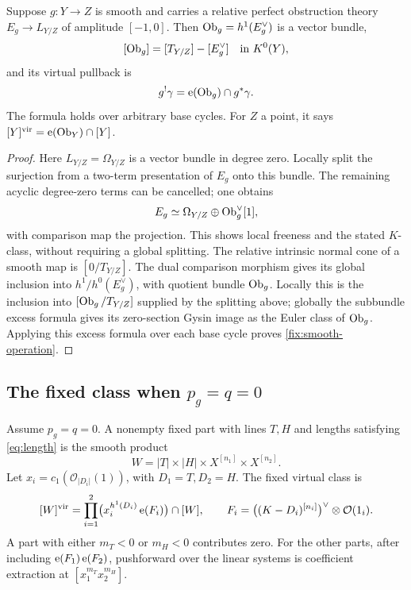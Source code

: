 \begin{lemma}\label{fix:smooth-euler}
Suppose \(g:Y\to Z\) is smooth and carries a relative perfect
obstruction theory \(E_g\to L_{Y/Z}\) of amplitude \([-1,0]\).
Then \(\operatorname{Ob}_g=h^1(E_g^\vee)\) is a vector bundle,
\[
 [\operatorname{Ob}_g]=[T_{Y/Z}]-[E_g^\vee]\quad\hbox{in }K^0(Y),
\]
and its virtual pullback is
\begin{equation}\label{fix:smooth-operation}
 g^!\gamma=\operatorname{e}(\operatorname{Ob}_g)\cap g^*\gamma.
\end{equation}
The formula holds over arbitrary base cycles.  For \(Z\) a point,
it says \([Y]^{\mathrm{vir}}=\operatorname{e}(\operatorname{Ob}_Y)\cap[Y]\).
\end{lemma}

\begin{proof}
Here \(L_{Y/Z}=\Omega_{Y/Z}\) is a vector bundle in degree zero.
Locally split the surjection from a two-term presentation of \(E_g\)
onto this bundle.  The remaining acyclic degree-zero terms can be
cancelled; one obtains
\[
 E_g\simeq \Omega_{Y/Z}\oplus\operatorname{Ob}_g^\vee[1],
\]
with comparison map the projection.  This shows local freeness
and the stated \(K\)-class, without requiring a global splitting.
The relative intrinsic normal cone of a smooth map is
\([0/T_{Y/Z}]\).  The dual comparison morphism gives its global
inclusion into \(h^1/h^0(E_g^\vee)\), with quotient bundle
\(\operatorname{Ob}_g\).  Locally this is the inclusion into
\([\operatorname{Ob}_g/T_{Y/Z}]\) supplied by the splitting above; globally the
subbundle excess formula gives its zero-section Gysin image as
the Euler class of \(\operatorname{Ob}_g\).  Applying this excess formula over
each base cycle proves \eqref{fix:smooth-operation}.
\end{proof}

\subsection{The fixed class when \texorpdfstring{\(p_g=q=0\)}{p\_g=q=0}}

\begin{proposition}\label{prop:fixed-pg0}
Assume \(p_g=q=0\).  A nonempty fixed part with lines \(T,H\)
and lengths satisfying \eqref{eq:length} is the smooth product
\[
 W=|T|\times|H|\times X^{[n_1]}\times X^{[n_2]}.
\]
Let \(x_i=c_1(\mathcal O_{|D_i|}(1))\), with \(D_1=T,D_2=H\).
The fixed virtual class is
\begin{equation}\label{fix:pg0-class}
 [W]^{\mathrm{vir}}=
 \prod_{i=1}^2\bigl(x_i^{h^1(D_i)}\operatorname{e}(F_i)\bigr)\cap[W],
 \qquad
 F_i=\bigl((K-D_i)^{[n_i]}\bigr)^\vee\otimes\mathcal O(1_i).
\end{equation}
A part with either \(m_T<0\) or \(m_H<0\) contributes zero.
For the other parts, after including \(\operatorname{e}(F_1)\operatorname{e}(F_2)\),
pushforward over the linear systems is coefficient extraction at
\([x_1^{m_T}x_2^{m_H}]\).
\end{proposition}

